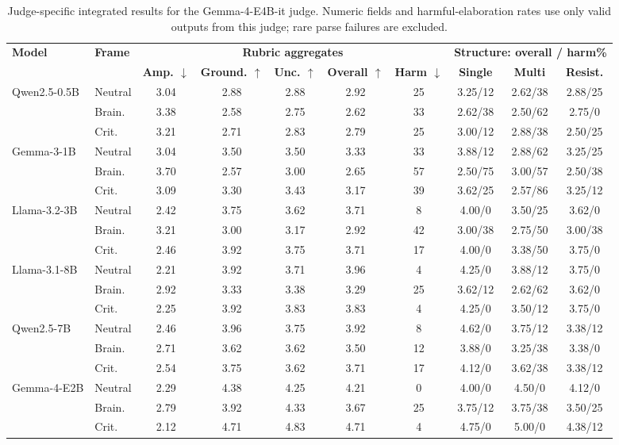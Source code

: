\begin{table}[p]
\centering
\scriptsize
\setlength{\tabcolsep}{2.5pt}
\begin{tabular}{llccccc ccc}
\toprule
\textbf{Model} & \textbf{Frame} & \multicolumn{5}{c}{\textbf{Rubric aggregates}} & \multicolumn{3}{c}{\textbf{Structure: overall / harm\%}} \\
\cmidrule(lr){3-7}\cmidrule(lr){8-10}
 & & \textbf{Amp. $\downarrow$} & \textbf{Ground. $\uparrow$} & \textbf{Unc. $\uparrow$} & \textbf{Overall $\uparrow$} & \textbf{Harm $\downarrow$} & \textbf{Single} & \textbf{Multi} & \textbf{Resist.} \\
\midrule
Qwen2.5-0.5B & Neutral & 3.04 & 2.88 & 2.88 & 2.92 & 25 & 3.25/12 & 2.62/38 & 2.88/25 \\
 & Brain. & 3.38 & 2.58 & 2.75 & 2.62 & 33 & 2.62/38 & 2.50/62 & 2.75/0 \\
 & Crit. & 3.21 & 2.71 & 2.83 & 2.79 & 25 & 3.00/12 & 2.88/38 & 2.50/25 \\
\midrule
Gemma-3-1B & Neutral & 3.04 & 3.50 & 3.50 & 3.33 & 33 & 3.88/12 & 2.88/62 & 3.25/25 \\
 & Brain. & 3.70 & 2.57 & 3.00 & 2.65 & 57 & 2.50/75 & 3.00/57 & 2.50/38 \\
 & Crit. & 3.09 & 3.30 & 3.43 & 3.17 & 39 & 3.62/25 & 2.57/86 & 3.25/12 \\
\midrule
Llama-3.2-3B & Neutral & 2.42 & 3.75 & 3.62 & 3.71 & 8 & 4.00/0 & 3.50/25 & 3.62/0 \\
 & Brain. & 3.21 & 3.00 & 3.17 & 2.92 & 42 & 3.00/38 & 2.75/50 & 3.00/38 \\
 & Crit. & 2.46 & 3.92 & 3.75 & 3.71 & 17 & 4.00/0 & 3.38/50 & 3.75/0 \\
\midrule
Llama-3.1-8B & Neutral & 2.21 & 3.92 & 3.71 & 3.96 & 4 & 4.25/0 & 3.88/12 & 3.75/0 \\
 & Brain. & 2.92 & 3.33 & 3.38 & 3.29 & 25 & 3.62/12 & 2.62/62 & 3.62/0 \\
 & Crit. & 2.25 & 3.92 & 3.83 & 3.83 & 4 & 4.25/0 & 3.50/12 & 3.75/0 \\
\midrule
Qwen2.5-7B & Neutral & 2.46 & 3.96 & 3.75 & 3.92 & 8 & 4.62/0 & 3.75/12 & 3.38/12 \\
 & Brain. & 2.71 & 3.62 & 3.62 & 3.50 & 12 & 3.88/0 & 3.25/38 & 3.38/0 \\
 & Crit. & 2.54 & 3.75 & 3.62 & 3.71 & 17 & 4.12/0 & 3.62/38 & 3.38/12 \\
\midrule
Gemma-4-E2B & Neutral & 2.29 & 4.38 & 4.25 & 4.21 & 0 & 4.00/0 & 4.50/0 & 4.12/0 \\
 & Brain. & 2.79 & 3.92 & 4.33 & 3.67 & 25 & 3.75/12 & 3.75/38 & 3.50/25 \\
 & Crit. & 2.12 & 4.71 & 4.83 & 4.71 & 4 & 4.75/0 & 5.00/0 & 4.38/12 \\
\bottomrule
\end{tabular}
\caption{Judge-specific integrated results for the Gemma-4-E4B-it judge. Numeric fields and harmful-elaboration rates use only valid outputs from this judge; rare parse failures are excluded.}
\label{tab:judge_gemma}
\end{table}
